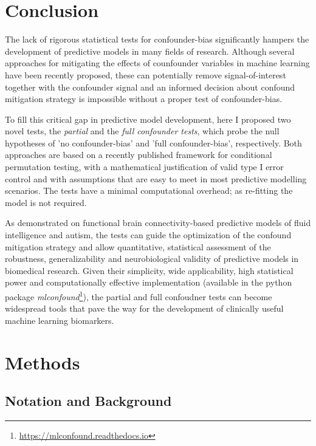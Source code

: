 \documentclass{article}
\begin{document}
\section{Conclusion}

The lack of rigorous statistical tests for confounder-bias significantly hampers the development of predictive models in many fields of research. Although several approaches for mitigating the effects of counfounder variables in machine learning have been recently proposed, these can potentially remove signal-of-interest together with the confounder signal and an informed decision about confound mitigation strategy is impossible without a proper test of confounder-bias.

To fill this critical gap in predictive model development, here I proposed two novel tests, the \emph{partial} and the \emph{full confounder tests}, which probe the null hypotheses of 'no confounder-bias' and 'full confounder-bias', respectively. Both approaches are based on a recently published framework for conditional permutation testing, with a mathematical justification of valid type I error control and with assumptions that are easy to meet in most predictive modelling scenarios. The tests have a minimal computational overhead; as re-fitting the model is not required.

As demonstrated on functional brain connectivity-based predictive models of fluid intelligence and autism, the tests can guide the optimization of the confound mitigation strategy and allow quantitative, statistical assessment of the robustness, generalizability and neurobiological validity of predictive models in biomedical research.
Given their simplicity, wide applicability, high statistical power and computationally effective implementation (available in the  python package \emph{mlconfound}\footnote{\href{https://mlconfound.readthedocs.io}{https://mlconfound.readthedocs.io}}), the partial and full confoudner tests can become widespread tools that pave the way for the development of clinically useful machine learning biomarkers.

\newpage
\section{Methods}
\label{sec:methods}

\subsection{Notation and Background}
\end{document}
